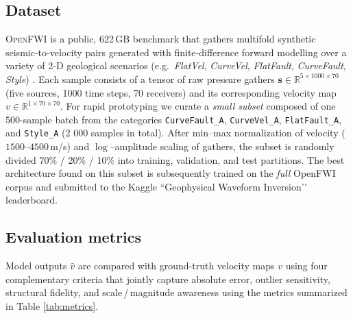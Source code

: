 \documentclass{article}
\begin{document}
\subsection{Dataset}\label{subsec:data}
\textsc{OpenFWI} is a public, 622\,GB benchmark that gathers multi\-fold synthetic seismic‐to‐velocity pairs generated with finite‐difference forward modelling over a variety of 2-D geological scenarios (e.g.\ \emph{FlatVel}, \emph{CurveVel}, \emph{FlatFault}, \emph{CurveFault}, \emph{Style}) \cite{openfwi2021,openfwi2023}.  Each sample consists of a tensor of raw pressure gathers $\mathbf{s}\!\in\!\mathbb{R}^{5\times1000\times70}$ (five sources, 1000 time steps, 70 receivers) and its corresponding velocity map $v\!\in\!\mathbb{R}^{1\times70\times70}$.  
For rapid prototyping we curate a \emph{small subset} composed of one 500-sample batch from the categories \texttt{CurveFault\_A}, \texttt{CurveVel\_A}, \texttt{FlatFault\_A}, and \texttt{Style\_A} (2 000 samples in total).  
After min–max normalization of velocity ($1500$–$4500$\,m/s) and $\log$–amplitude scaling of gathers, the subset is randomly divided 70\% / 20\% / 10\% into training, validation, and test partitions.  
The best architecture found on this subset is subsequently trained on the \emph{full} OpenFWI corpus and submitted to the Kaggle “Geophysical Waveform Inversion’’ leaderboard.

\subsection{Evaluation metrics}\label{subsec:metrics}
Model outputs $\hat{v}$ are compared with ground-truth velocity maps $v$ using four complementary criteria that jointly capture absolute error, outlier sensitivity, structural fidelity, and scale\,/\,magnitude awareness using the metrics summarized in Table \ref{tab:metrics}.
\end{document}
